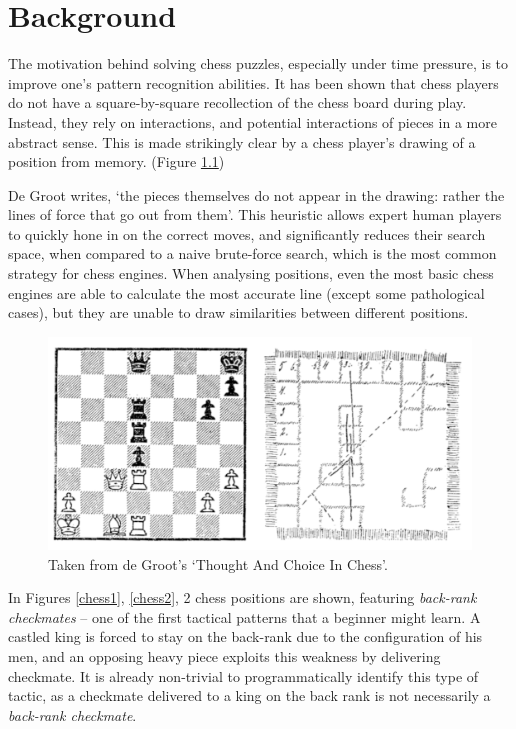 \chapter{Background}

The motivation behind solving chess puzzles, especially under time pressure, is
to improve one's pattern recognition abilities. It has been shown
\cite{thoughtAndChoice} that chess players do not have a square-by-square
recollection of the chess board during play. Instead, they rely on
interactions, and potential interactions of pieces in a more abstract sense.
This is made strikingly clear by a chess player's drawing of a position from
memory. (Figure \ref{deGrootFigure})

De Groot writes, `the pieces themselves do not appear in the drawing: rather
the lines of force that go out from them'. This heuristic allows expert human
players to quickly hone in on the correct moves,\cite{bilalic2010mechanisms}
and significantly reduces their search space, when compared to a naive
brute-force search, which is the most common strategy for chess engines. When
analysing positions, even the most basic chess engines are able to calculate
the most accurate line (except some pathological cases), but they are unable to
draw similarities between different positions.

\begin{figure}[H]
    \centering
    \includegraphics[width=0.9\linewidth]{background/img/deGroot.png}
    \caption{Taken from de Groot's `Thought And Choice In Chess'.\cite{thoughtAndChoice}}
    \label{deGrootFigure}
\end{figure}

In Figures \ref{chess1}, \ref{chess2}, 2 chess positions are shown, featuring
\emph{back-rank checkmates} -- one of the first tactical patterns that a
beginner might learn. A castled king is forced to stay on the back-rank due to
the configuration of his men, and an opposing heavy piece exploits this
weakness by delivering checkmate. It is already non-trivial to programmatically
identify this type of tactic, as a checkmate delivered to a king on the back
rank is not necessarily a \emph{back-rank checkmate}.

